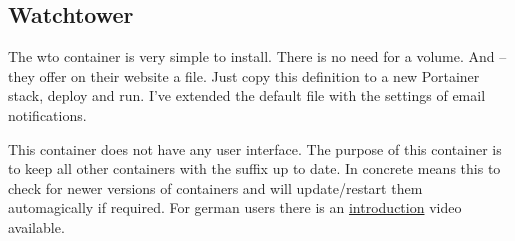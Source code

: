 

\subsection{Watchtower}

The \gls{wto} container is very
simple to install. There is no need for a volume. And -- they offer on their
website a  file. Just copy this definition
to a new Portainer stack, deploy and run. I've extended the default file with
the settings of email notifications. 

This container does not have any user interface. The purpose of this container
is to keep all other containers with the  suffix up
to date. In concrete means this to check for newer versions of containers and
will update/restart them automagically if required. For german users there is
an \href{https://www.youtube.com/watch?v=TFS-s5Aq028}{introduction} video
available.
